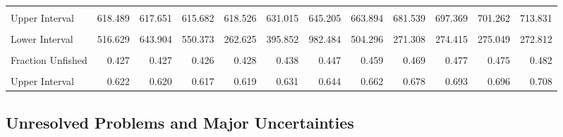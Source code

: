 \documentclass[11pt,
  english,
  a4paper,
]{article}
\begin{document}
\begin{table}[H]
{\begin{tabular}[t]{lrrrrrrrrrrr}
\cellcolor{gray!6}{Lower Interval} & \cellcolor{gray!6}{216.763} & \cellcolor{gray!6}{217.755} & \cellcolor{gray!6}{217.570} & \cellcolor{gray!6}{219.116} & \cellcolor{gray!6}{225.337} & \cellcolor{gray!6}{228.489} & \cellcolor{gray!6}{232.930} & \cellcolor{gray!6}{235.071} & \cellcolor{gray!6}{236.253} & \cellcolor{gray!6}{227.774} & \cellcolor{gray!6}{228.525}\\
Upper Interval & 618.489 & 617.651 & 615.682 & 618.526 & 631.015 & 645.205 & 663.894 & 681.539 & 697.369 & 701.262 & 713.831\\
\addlinespace
\cellcolor{gray!6}{Recruits} & \cellcolor{gray!6}{845.517} & \cellcolor{gray!6}{1025.460} & \cellcolor{gray!6}{892.128} & \cellcolor{gray!6}{470.136} & \cellcolor{gray!6}{683.215} & \cellcolor{gray!6}{1628.800} & \cellcolor{gray!6}{1008.840} & \cellcolor{gray!6}{688.065} & \cellcolor{gray!6}{743.171} & \cellcolor{gray!6}{747.805} & \cellcolor{gray!6}{736.076}\\
Lower Interval & 516.629 & 643.904 & 550.373 & 262.625 & 395.852 & 982.484 & 504.296 & 271.308 & 274.415 & 275.049 & 272.812\\
\cellcolor{gray!6}{Upper Interval} & \cellcolor{gray!6}{1383.777} & \cellcolor{gray!6}{1633.113} & \cellcolor{gray!6}{1446.097} & \cellcolor{gray!6}{841.609} & \cellcolor{gray!6}{1179.184} & \cellcolor{gray!6}{2700.287} & \cellcolor{gray!6}{2018.176} & \cellcolor{gray!6}{1745.005} & \cellcolor{gray!6}{2012.658} & \cellcolor{gray!6}{2033.134} & \cellcolor{gray!6}{1986.015}\\
Fraction Unfished & 0.427 & 0.427 & 0.426 & 0.428 & 0.438 & 0.447 & 0.459 & 0.469 & 0.477 & 0.475 & 0.482\\
\cellcolor{gray!6}{Lower Interval} & \cellcolor{gray!6}{0.232} & \cellcolor{gray!6}{0.234} & \cellcolor{gray!6}{0.235} & \cellcolor{gray!6}{0.238} & \cellcolor{gray!6}{0.245} & \cellcolor{gray!6}{0.250} & \cellcolor{gray!6}{0.255} & \cellcolor{gray!6}{0.259} & \cellcolor{gray!6}{0.261} & \cellcolor{gray!6}{0.254} & \cellcolor{gray!6}{0.256}\\
\addlinespace
Upper Interval & 0.622 & 0.620 & 0.617 & 0.619 & 0.631 & 0.644 & 0.662 & 0.678 & 0.693 & 0.696 & 0.708\\
\bottomrule
\end{tabular}}
\end{table}

\FloatBarrier


\hypertarget{unresolved-problems-and-major-uncertainties}{%
\subsection*{Unresolved Problems and Major Uncertainties}\label{unresolved-problems-and-major-uncertainties}}
\end{document}
